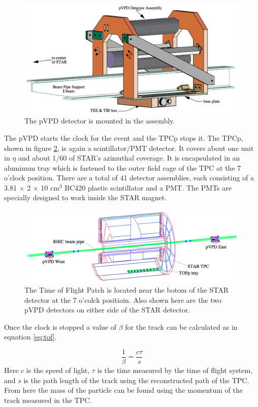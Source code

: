 \documentclass[abstract = on,listof=totoc, bibliography=totoc]{scrreprt}
\begin{document}
\begin{figure}
\begin{center}
\includegraphics[width = .6\textwidth]{vpdAssembly}
\caption[pVPD Assembly]{The pVPD detector is mounted in the assembly.}
\label{fig:vpdAssembly}
\end{center}
\end{figure}

The pVPD starts the clock for the event and the TPCp stops it. The TPCp, shown in figure \ref{fig:starToF}, is again a scintillator/PMT detector. It covers about one unit in $\eta$ and about 1/60 of STAR's azimuthal coverage. It is encapsulated in an aluminum tray which is fastened to the outer field cage of the TPC at the 7 o'clock position. There are a total of 41 detector assemblies, each consisting of a 3.81 $\times$ 2 $\times$ 10 cm$^3$ BC420 plastic scintillator and a PMT. The PMTs are specially designed to work inside the STAR magnet.\cite{TOFppVPD}




\begin{figure}
\begin{center}
\includegraphics[width = .9\textwidth]{starToF}
\caption[STAR Time of Flight System]{The Time of Flight Patch is located near the botom of the STAR detector at the 7 o'colck positioin. Also shown here are the two pVPD detectors on either side of the STAR detector.}
\label{fig:starToF}
\end{center}
\end{figure}

Once the clock is stopped a value of $\beta$ for the track can be calculated as in equation \ref{eq:tof}. 

\begin{equation}
\label{eq:tof}
\frac{1}{\beta} = \frac{c\tau}{s}
\end{equation}
%
Here $c$ is the speed of light, $\tau$ is the time measured by the time of flight system, and $s$ is the path length of the track using the reconstructed path of the TPC. From here the mass of the particle can be found using the momentum of the track measured in the TPC.
\end{document}
